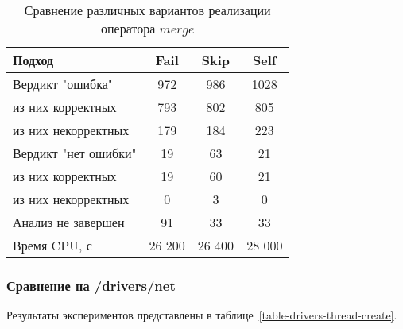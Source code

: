 \begin{center}
  \begin{table}[h]\footnotesize \centering
  	\label{table-svcomp-thread-create}
    \caption{Сравнение различных вариантов реализации оператора $merge$}
    \begin{tabular}{ | l | c | c | c |}
      \hline
      Подход         				& Fail 	& Skip 	& Self  	\\ \hline
      Вердикт "ошибка" 				& 972   & 986   & 1028       \\ 
  \hspace{0.5cm} из них корректных 	& 793 	& 802 	& 805    	\\ 
  \hspace{0.5cm} из них некорректных & 179 	& 184 	& 223     	\\ \hline
      Вердикт "нет ошибки"  		& 19    & 63    & 21       	\\ 
  \hspace{0.5cm} из них корректных 	& 19 	& 60    & 21      	\\
  \hspace{0.5cm} из них некорректных & 0 	& 3    	& 0     	\\ \hline
      Анализ не завершен       		& 91    & 33    & 33    	\\ \hline
      Время CPU, с   				& 26 200 & 26 400 & 28 000  \\ 
      \hline
    \end{tabular}
  \end{table}
\end{center}

\subsubsection{Сравнение на /drivers/net}
Результаты экспериментов представлены в таблице~\ref{table-drivers-thread-create}.

